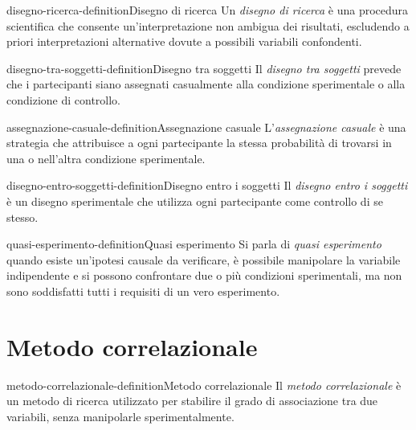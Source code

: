\documentclass[preview]{standalone}
\begin{document}
\begin{snippetdefinition}{disegno-ricerca-definition}{Disegno di ricerca}
    Un \emph{disegno di ricerca} è una procedura scientifica che consente
    un'interpretazione non ambigua dei risultati, escludendo a priori
    interpretazioni alternative dovute a possibili variabili confondenti.
\end{snippetdefinition}

\begin{snippetdefinition}{disegno-tra-soggetti-definition}{Disegno tra soggetti}
    Il \emph{disegno tra soggetti} prevede che i partecipanti siano assegnati
    casualmente alla condizione sperimentale o alla condizione di controllo.
\end{snippetdefinition}

\begin{snippetdefinition}{assegnazione-casuale-definition}{Assegnazione casuale}
    L'\emph{assegnazione casuale} è una strategia che attribuisce a ogni
    partecipante la stessa probabilità di trovarsi in una o nell'altra
    condizione sperimentale.
\end{snippetdefinition}

\begin{snippetdefinition}{disegno-entro-soggetti-definition}{Disegno entro i soggetti}
    Il \emph{disegno entro i soggetti} è un disegno sperimentale che utilizza
    ogni partecipante come controllo di se stesso.
\end{snippetdefinition}

\begin{snippetdefinition}{quasi-esperimento-definition}{Quasi esperimento}
    Si parla di \emph{quasi esperimento} quando esiste un'ipotesi causale da
    verificare, è possibile manipolare la variabile indipendente e si possono
    confrontare due o più condizioni sperimentali, ma non sono soddisfatti tutti
    i requisiti di un vero esperimento.
\end{snippetdefinition}

\section{Metodo correlazionale}

\begin{snippetdefinition}{metodo-correlazionale-definition}{Metodo correlazionale}
    Il \emph{metodo correlazionale} è un metodo di ricerca utilizzato per
    stabilire il grado di associazione tra due variabili, senza manipolarle
    sperimentalmente.
\end{snippetdefinition}
\end{document}
